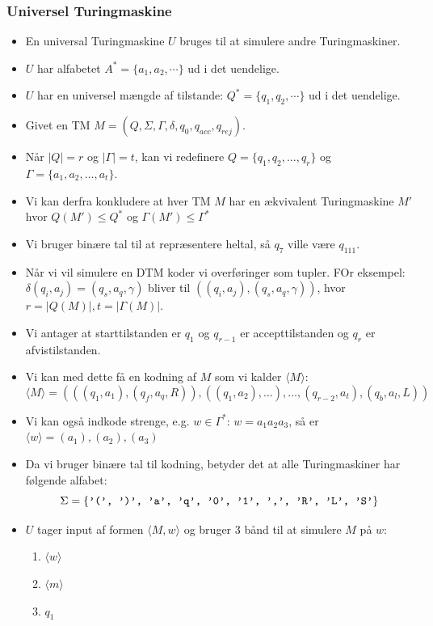 \begin{frame}[allowframebreaks]
  \frametitle{Universel Turingmaskine}
\begin{itemize}
  \item En universal Turingmaskine $U$ bruges til at simulere andre Turingmaskiner.
  \item $U$ har alfabetet $A^{*} = \{a_{1}, a_{2}, \cdots\}$ ud i det uendelige.
  \item $U$ har en universel mængde af tilstande: $Q^{*} = \{q_{1}, q_{2}, \cdots\}$ ud i det uendelige.
  \item Givet en TM $M = (Q, \Sigma, \Gamma, \delta, q_{0}, q_{acc}, q_{rej})$.
  \item Når $|Q| = r$ og $|\Gamma| = t$, kan vi redefinere $Q = \{q_{1}, q_{2}, \ldots, q_{r}\}$ og $\Gamma = \{a_{1}, a_{2}, \ldots, a_{t}\}$.
  \item Vi kan derfra konkludere at hver TM $M$ har en ækvivalent Turingmaskine $M'$ hvor $Q(M') \le Q^{*}$ og $\Gamma(M') \le \Gamma^{*}$
  \item Vi bruger binære tal til at repræsentere heltal, så $q_{7}$ ville være $q_{111}$.
  \item Når vi vil simulere en DTM koder vi overføringer som tupler. FOr eksempel: $\delta(q_{i}, a_{j}) = (q_{s}, a_{q}, \gamma)$ bliver til $((q_{i}, a_{j}), (q_{s}, a_{q}, \gamma))$, hvor $r = |Q(M)|, t = |\Gamma(M)|$.
  \item Vi antager at starttilstanden er $q_{1}$ og $q_{r-1}$ er accepttilstanden og $q_{r}$ er afvistilstanden.
  \item Vi kan med dette få en kodning af $M$ som vi kalder $\langle M \rangle$:
        \begin{equation*}
\langle M \rangle = (((q_{1}, a_{1}), (q_{f}, a_{q}, R)), ((q_{1}, a_{2}), \ldots), \ldots, (q_{r-2}, a_{t}), (q_{b}, a_{l}, L))
        \end{equation*}


  \item Vi kan også indkode strenge, e.g. $w \in \Gamma^{*}$: $w = a_{1}a_{2}a_{3}$, så er $\langle w \rangle = (a_{1}), (a_{2}), (a_{3})$
  \item Da vi bruger binære tal til kodning, betyder det at alle Turingmaskiner har følgende alfabet:
        \begin{equation*}
\Sigma = \{\text{\texttt{'(', ')', 'a', 'q', '0', '1', ',', 'R', 'L', 'S'}}\}
        \end{equation*}
  \item $U$ tager input af formen $\langle M,w \rangle$ og bruger 3 bånd til at simulere $M$ på $w$:
        \begin{enumerate}
          \item $\langle w\rangle $
          \item $\langle m \rangle $
          \item $q_{1}$
        \end{enumerate}


\end{itemize}
\end{frame}
